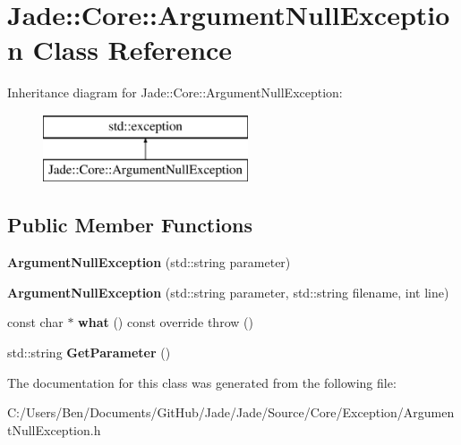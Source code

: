 \hypertarget{class_jade_1_1_core_1_1_argument_null_exception}{}\section{Jade\+:\+:Core\+:\+:Argument\+Null\+Exception Class Reference}
\label{class_jade_1_1_core_1_1_argument_null_exception}
Inheritance diagram for Jade\+:\+:Core\+:\+:Argument\+Null\+Exception\+:\begin{figure}[H]
\begin{center}
\leavevmode
\includegraphics[height=2.000000cm]{class_jade_1_1_core_1_1_argument_null_exception}
\end{center}
\end{figure}
\subsection*{Public Member Functions}
\begin{DoxyCompactItemize}
\item 
\hypertarget{class_jade_1_1_core_1_1_argument_null_exception_a35c3013c192fe3c367e2c86a5dcb27b2}{}{\bfseries Argument\+Null\+Exception} (std\+::string parameter)\label{class_jade_1_1_core_1_1_argument_null_exception_a35c3013c192fe3c367e2c86a5dcb27b2}

\item 
\hypertarget{class_jade_1_1_core_1_1_argument_null_exception_a89ca4df20010e0ce6d64fde9c782af46}{}{\bfseries Argument\+Null\+Exception} (std\+::string parameter, std\+::string filename, int line)\label{class_jade_1_1_core_1_1_argument_null_exception_a89ca4df20010e0ce6d64fde9c782af46}

\item 
\hypertarget{class_jade_1_1_core_1_1_argument_null_exception_a41c747ac08349b4e0ab711a6e19d8553}{}const char $\ast$ {\bfseries what} () const  override  throw ()\label{class_jade_1_1_core_1_1_argument_null_exception_a41c747ac08349b4e0ab711a6e19d8553}

\item 
\hypertarget{class_jade_1_1_core_1_1_argument_null_exception_a750db6a7717709551e1a5542a1d39034}{}std\+::string {\bfseries Get\+Parameter} ()\label{class_jade_1_1_core_1_1_argument_null_exception_a750db6a7717709551e1a5542a1d39034}

\end{DoxyCompactItemize}


The documentation for this class was generated from the following file\+:\begin{DoxyCompactItemize}
\item 
C\+:/\+Users/\+Ben/\+Documents/\+Git\+Hub/\+Jade/\+Jade/\+Source/\+Core/\+Exception/Argument\+Null\+Exception.\+h\end{DoxyCompactItemize}
